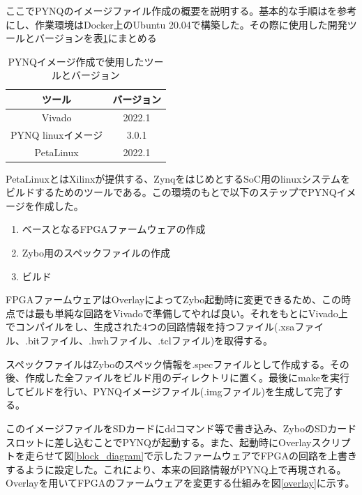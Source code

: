 ここでPYNQのイメージファイル作成の概要を説明する。基本的な手順は\cite{image}を参考にし、作業環境はDocker上のUbuntu 20.04で構築した。その際に使用した開発ツールとバージョンを表\ref{PYNQ_table}にまとめる

\begin{table}[htbp]
  \centering
  \caption{PYNQイメージ作成で使用したツールとバージョン}
  \vspace{3mm}
  \begin{tabular}{cc} \hline
    ツール & バージョン \\ \hline
    Vivado & 2022.1\\
    PYNQ linuxイメージ & 3.0.1\\
    PetaLinux & 2022.1\\ \hline
  \end{tabular}
  \label{PYNQ_table}
\end{table}

PetaLinuxとはXilinxが提供する、ZynqをはじめとするSoC用のlinuxシステムをビルドするためのツールである。この環境のもとで以下のステップでPYNQイメージを作成した。
\begin{enumerate}
  \item ベースとなるFPGAファームウェアの作成
  \item Zybo用のスペックファイルの作成
  \item ビルド
\end{enumerate}

FPGAファームウェアはOverlayによってZybo起動時に変更できるため、この時点では最も単純な回路をVivadoで準備してやれば良い。それをもとにVivado上でコンパイルをし、生成された4つの回路情報を持つファイル(.xsaファイル、.bitファイル、.hwhファイル、.tclファイル)を取得する。

スペックファイルはZyboのスペック情報を.specファイルとして作成する。その後、作成した全ファイルをビルド用のディレクトリに置く。最後にmakeを実行してビルドを行い、PYNQイメージファイル(.imgファイル)を生成して完了する。

このイメージファイルをSDカードにddコマンド等で書き込み、ZyboのSDカードスロットに差し込むことでPYNQが起動する。また、起動時にOverlayスクリプトを走らせて図\ref{block_diagram}で示したファームウェアでFPGAの回路を上書きするように設定した。これにより、本来の回路情報がPYNQ上で再現される。Overlayを用いてFPGAのファームウェアを変更する仕組みを図\ref{overlay}に示す。

